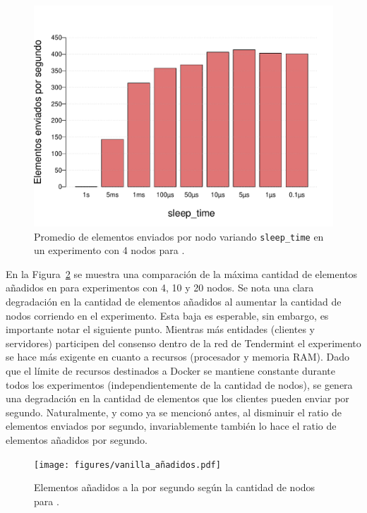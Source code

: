 \begin{figure}
	\centering
	\includegraphics[scale=0.5]{figures/sleep_time_2.pdf}
	\caption{Promedio de elementos enviados por nodo variando \texttt{sleep\_time} en un experimento con 4 nodos para \vanilla.}
	\label{fig:elements_against_sleep_time}
\end{figure}

En la Figura~\ref{fig:vanilla_results} se muestra una comparación de la máxima cantidad de elementos añadidos en \vanilla para experimentos con
4, 10 y 20 nodos.
%
Se nota una clara degradación en la cantidad de elementos añadidos al aumentar la cantidad de nodos corriendo en el experimento.
Esta baja es esperable, sin embargo, es importante notar el siguiente punto.
Mientras más entidades (clientes y servidores) participen del consenso dentro de la red de Tendermint el experimento se hace más exigente en cuanto a recursos
(procesador y memoria RAM).
Dado que el límite de recursos destinados a Docker se mantiene constante durante todos los experimentos (independientemente de la cantidad de nodos),
se genera una degradación en la cantidad de elementos que los clientes pueden enviar por segundo.
Naturalmente, y como ya se mencionó antes, al disminuir el ratio de elementos enviados por segundo, invariablemente también lo hace el ratio de
elementos añadidos por segundo.

\begin{figure}
	\centering
	\texttt{[image: figures/vanilla\_añadidos.pdf]}
	\caption{Elementos añadidos a la \setchain por segundo según la cantidad de nodos para \vanilla.}
	\label{fig:vanilla_results}
\end{figure}

